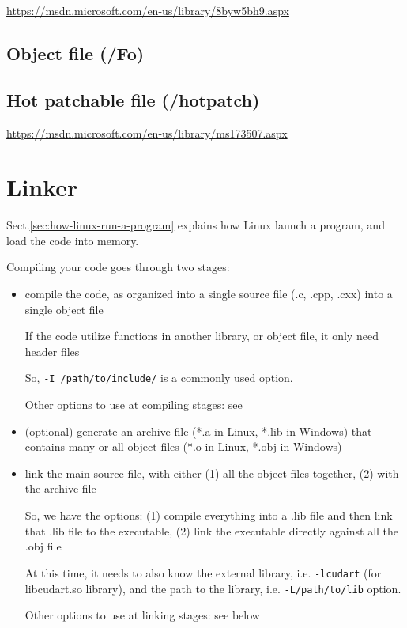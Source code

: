 \url{https://msdn.microsoft.com/en-us/library/8byw5bh9.aspx}

\subsection{Object file (/Fo)}
\label{sec:object_file_/Fo}


\subsection{Hot patchable file (/hotpatch)}
\url{https://msdn.microsoft.com/en-us/library/ms173507.aspx}

\section{Linker}
\label{sec:linker}

Sect.\ref{sec:how-linux-run-a-program} explains how Linux launch a program, and
load the code into memory.

Compiling your code goes through two stages:
\begin{itemize}
  \item compile the code, as organized into a single source file (.c, .cpp, .cxx) into a single object file 
  
  If the code utilize functions in another library, or object file, it only need header files 
  
  So, \verb!-I /path/to/include/! is a commonly used option.
  
   Other options to use at compiling stages: see 
  
  \item (optional) generate an archive file (*.a in Linux, *.lib in Windows)
  that contains many or all object files (*.o in Linux, *.obj in Windows)
  
  
  \item link the main source file, with either (1) all the object files together, (2) with the archive file
  
 So, we have the options: (1) compile everything into a .lib file and then link that .lib file to the executable, 
 (2) link the executable directly against all the .obj file
  
 At this time, it needs to also know the external library, i.e. \verb!-lcudart! (for libcudart.so library), and
 the path to the library, i.e. \verb!-L/path/to/lib! option.  

 Other options to use at linking stages: see below
\end{itemize}

